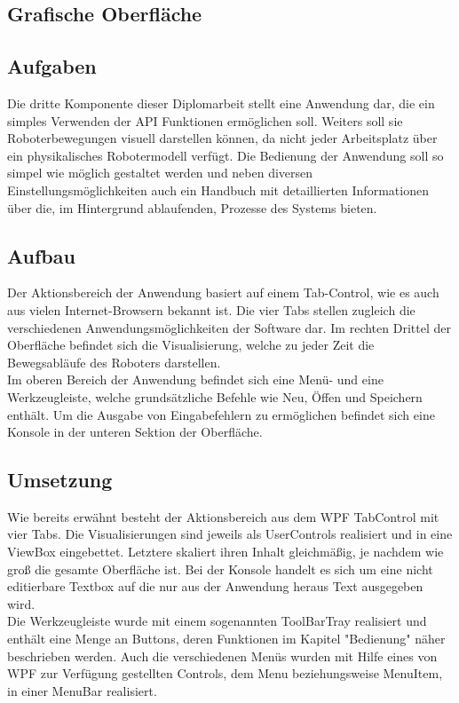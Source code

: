 
\subsection{Grafische Oberfläche}

\subsection{Aufgaben}
Die dritte Komponente dieser Diplomarbeit stellt eine Anwendung dar, die ein simples Verwenden der API Funktionen ermöglichen soll. Weiters soll sie Roboterbewegungen visuell darstellen können, da nicht jeder Arbeitsplatz über ein physikalisches Robotermodell verfügt. Die Bedienung der Anwendung soll so simpel wie möglich gestaltet werden und neben diversen Einstellungsmöglichkeiten auch ein Handbuch mit detaillierten Informationen über die, im Hintergrund ablaufenden, Prozesse des Systems bieten.
\subsection{Aufbau}
Der Aktionsbereich der Anwendung basiert auf einem Tab-Control, wie es auch aus vielen Internet-Browsern bekannt ist. Die vier Tabs stellen zugleich die verschiedenen Anwendungsmöglichkeiten der Software dar. Im rechten Drittel der Oberfläche befindet sich die Visualisierung, welche zu jeder Zeit die Bewegsabläufe des Roboters darstellen. \\
Im oberen Bereich der Anwendung befindet sich eine Menü- und eine Werkzeugleiste, welche grundsätzliche Befehle wie Neu, Öffen und Speichern enthält. Um die Ausgabe von Eingabefehlern zu ermöglichen befindet sich eine Konsole in der unteren Sektion der Oberfläche.
\subsection{Umsetzung}
Wie bereits erwähnt besteht der Aktionsbereich aus dem WPF TabControl mit vier Tabs. Die Visualisierungen sind jeweils als UserControls realisiert und in eine ViewBox eingebettet. Letztere skaliert ihren Inhalt gleichmäßig, je nachdem wie groß die gesamte Oberfläche ist. Bei der Konsole handelt es sich um eine nicht editierbare Textbox auf die nur aus der Anwendung heraus Text ausgegeben wird. \\
Die Werkzeugleiste wurde mit einem sogenannten ToolBarTray realisiert und enthält eine Menge an Buttons, deren Funktionen im Kapitel "Bedienung" näher beschrieben werden. Auch die verschiedenen Menüs wurden mit Hilfe eines von WPF zur Verfügung gestellten Controls, dem Menu beziehungsweise MenuItem, in einer MenuBar realisiert.
